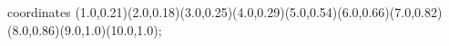 					coordinates { (1.0,0.21)(2.0,0.18)(3.0,0.25)(4.0,0.29)(5.0,0.54)(6.0,0.66)(7.0,0.82)(8.0,0.86)(9.0,1.0)(10.0,1.0)};